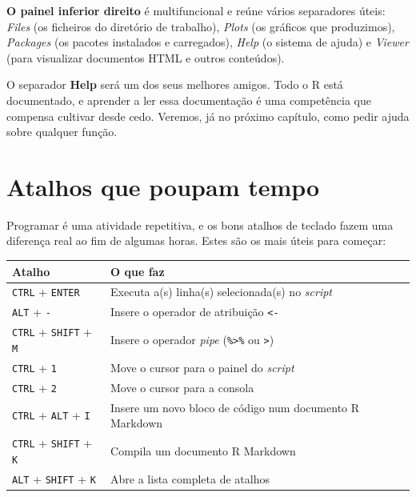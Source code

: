 \documentclass[
  portuguese,
  11pt,
  openany]{book}
\newcounter{none} %
\begin{document}
\textbf{O painel inferior direito} é multifuncional e reúne vários separadores úteis:
\emph{Files} (os ficheiros do diretório de trabalho), \emph{Plots} (os gráficos que
produzimos), \emph{Packages} (os pacotes instalados e carregados), \emph{Help} (o sistema
de ajuda) e \emph{Viewer} (para visualizar documentos HTML e outros conteúdos).

O separador \textbf{Help} será um dos seus melhores amigos. Todo o R está documentado,
e aprender a ler essa documentação é uma competência que compensa cultivar desde
cedo. Veremos, já no próximo capítulo, como pedir ajuda sobre qualquer função.

\section{Atalhos que poupam tempo}\label{atalhos-que-poupam-tempo}

Programar é uma atividade repetitiva, e os bons atalhos de teclado fazem uma
diferença real ao fim de algumas horas. Estes são os mais úteis para começar:

{\def\LTcaptype{none} %
\begin{longtable}[]{@{}
  >{\raggedright\arraybackslash}p{}
  >{\raggedright\arraybackslash}p{}@{}}
\toprule\noalign{}
\begin{minipage}[b]{\linewidth}\raggedright
Atalho
\end{minipage} & \begin{minipage}[b]{\linewidth}\raggedright
O que faz
\end{minipage} \\
\midrule\noalign{}
\endhead
\bottomrule\noalign{}
\endlastfoot
\texttt{CTRL} + \texttt{ENTER} & Executa a(s) linha(s) selecionada(s) no \emph{script} \\
\texttt{ALT} + \texttt{-} & Insere o operador de atribuição \texttt{\textless{}-} \\
\texttt{CTRL} + \texttt{SHIFT} + \texttt{M} & Insere o operador \emph{pipe} (\texttt{\%\textgreater{}\%} ou \texttt{\textbar{}\textgreater{}}) \\
\texttt{CTRL} + \texttt{1} & Move o cursor para o painel do \emph{script} \\
\texttt{CTRL} + \texttt{2} & Move o cursor para a consola \\
\texttt{CTRL} + \texttt{ALT} + \texttt{I} & Insere um novo bloco de código num documento R Markdown \\
\texttt{CTRL} + \texttt{SHIFT} + \texttt{K} & Compila um documento R Markdown \\
\texttt{ALT} + \texttt{SHIFT} + \texttt{K} & Abre a lista completa de atalhos \\
\end{longtable}
}
\end{document}
